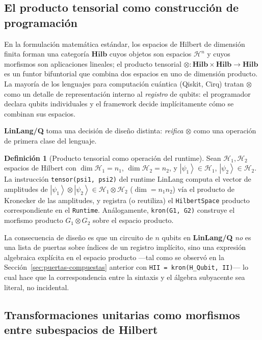 \documentclass[12pt, a4paper, openany]{report}
\theoremstyle{definition}
\newtheorem{definition}{Definición}[chapter]
\newcommand{\linlangQ}{\textbf{LinLang/Q}}
\newcommand{\ket}[1]{\left|#1\right\rangle}
\begin{document}
\subsection{El producto tensorial como construcción de programación}

En la formulación matemática estándar, los espacios de Hilbert de dimensión finita forman una categoría $\mathbf{Hilb}$ cuyos objetos son espacios $\mathcal{H}^n$ y cuyos morfismos son aplicaciones lineales; el producto tensorial $\otimes: \mathbf{Hilb} \times \mathbf{Hilb} \to \mathbf{Hilb}$ es un funtor bifuntorial que combina dos espacios en uno de dimensión producto. La mayoría de los lenguajes para computación cuántica (Qiskit, Cirq) tratan $\otimes$ como un detalle de representación interno al \emph{registro} de qubits: el programador declara qubits individuales y el framework decide implícitamente cómo se combinan sus espacios.

\linlangQ{} toma una decisión de diseño distinta: \emph{reifica} $\otimes$ como una operación de primera clase del lenguaje.

\begin{definition}[Producto tensorial como operación del runtime]
\label{def:tensor-runtime}
Sean $\mathcal{H}_1, \mathcal{H}_2$ espacios de Hilbert con $\dim \mathcal{H}_1 = n_1$, $\dim \mathcal{H}_2 = n_2$, y $\ket{\psi_1} \in \mathcal{H}_1$, $\ket{\psi_2} \in \mathcal{H}_2$. La instrucción \texttt{tensor(psi1, psi2)} del runtime LinLang computa el vector de amplitudes de $\ket{\psi_1}\otimes\ket{\psi_2} \in \mathcal{H}_1 \otimes \mathcal{H}_2$ ($\dim = n_1 n_2$) vía el producto de Kronecker de las amplitudes, y registra (o reutiliza) el \texttt{HilbertSpace} producto correspondiente en el \texttt{Runtime}. Análogamente, \texttt{kron(G1, G2)} construye el morfismo producto $G_1 \otimes G_2$ sobre el espacio producto.
\end{definition}

La consecuencia de diseño es que un circuito de $n$ qubits en \linlangQ{} \emph{no} es una lista de puertas sobre índices de un registro implícito, sino una expresión algebraica explícita en el espacio producto —tal como se observó en la Sección~\ref{sec:puertas-compuestas} anterior con \texttt{HII = kron(H\_Qubit, II)}— lo cual hace que la correspondencia entre la sintaxis y el álgebra subyacente sea literal, no incidental.

\subsection{Transformaciones unitarias como morfismos entre subespacios de Hilbert}
\end{document}
